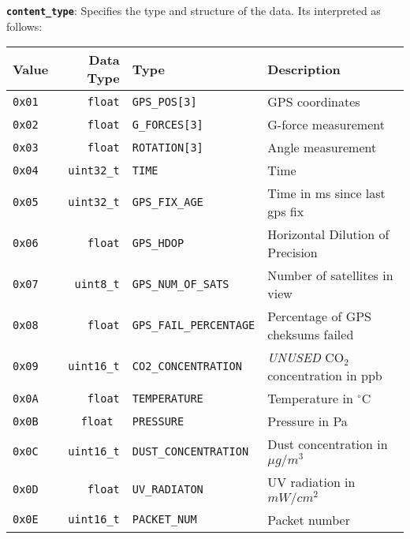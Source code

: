 \documentclass[a4paper]{article}
\begin{document}
\textbf{\texttt{content\_type}}: Specifies the type and structure of the data. Its interpreted as follows:
\begin{longtable}{@{}lrll@{}}
  \toprule
  Value         & Data Type         & Type                           & Description                      \\
  \midrule
  \texttt{0x01} & \texttt{float}    &\texttt{GPS\_POS[3]}            & GPS coordinates                          \\
  \texttt{0x02} & \texttt{float}    &\texttt{G\_FORCES[3]}           & G-force measurement                      \\
  \texttt{0x03} & \texttt{float}    &\texttt{ROTATION[3]}            & Angle measurement                        \\
  \texttt{0x04} & \texttt{uint32\_t}&\texttt{TIME}                   & Time                                     \\
  \texttt{0x05} & \texttt{uint32\_t}&\texttt{GPS\_FIX\_AGE}          & Time in ms since last gps fix            \\
  \texttt{0x06} & \texttt{float}    &\texttt{GPS\_HDOP}              & Horizontal Dilution of Precision         \\
  \texttt{0x07} & \texttt{uint8\_t} &\texttt{GPS\_NUM\_OF\_SATS}     & Number of satellites in view             \\
  \texttt{0x08} & \texttt{float}    &\texttt{GPS\_FAIL\_PERCENTAGE}  & Percentage of GPS cheksums failed        \\
  \texttt{0x09} & \texttt{uint16\_t}&\texttt{CO2\_CONCENTRATION}     & \emph{UNUSED} CO$_2$ concentration in ppb\\
  \texttt{0x0A} & \texttt{float}    &\texttt{TEMPERATURE}            & Temperature in $^\circ$C                 \\
  \texttt{0x0B} & \texttt{float    }&\texttt{PRESSURE}               & Pressure in Pa                           \\
  \texttt{0x0C} & \texttt{uint16\_t}&\texttt{DUST\_CONCENTRATION}    & Dust concentration in $\mu g/m^3$        \\
  \texttt{0x0D} & \texttt{float}    &\texttt{UV\_RADIATON}           & UV radiation in $mW/cm^2$                \\
  \texttt{0x0E} & \texttt{uint16\_t}&\texttt{PACKET\_NUM}             & Packet number                            \\
  \bottomrule
\end{longtable}
\end{document}
